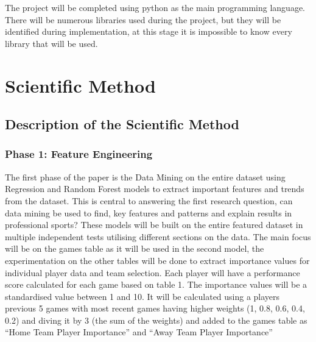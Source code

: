\documentclass{imc-inf}
\begin{document}
	
	The project will be completed using python as the main programming language. There will be numerous libraries used during the project, but they will be identified during implementation, at this stage it is impossible to know every library that will be used.
	
	\chapter{Scientific Method}\label{chap:method}
	\section{Description of the Scientific Method }
	\subsection{Phase 1: Feature Engineering}
	The first phase of the paper is the Data Mining on the entire dataset using Regression and Random Forest models to extract important features and trends from the dataset. This is central to answering the first research question, can data mining be used to find, key features and patterns and explain results in professional sports?
	These models will be built on the entire featured dataset in multiple independent tests utilising different sections on the data. The main focus will be on the games table as it will be used in the second model, the experimentation on the other tables will be done to extract importance values for individual player data and team selection.
	Each player will have a performance score calculated for each game based on table 1.
	The importance values will be a standardised value between 1 and 10. It will be calculated using a players previous 5 games with most recent games having higher weights (1, 0.8, 0.6, 0.4, 0.2) and diving it by 3 (the sum of the weights) and added to the games table as “Home Team Player Importance” and “Away Team Player Importance”
\end{document}
